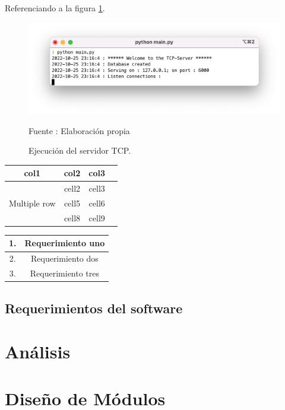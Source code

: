 Referenciando a la figura \ref{fig:servertcp_console}.
\begin{figure}[H]
    \begin{center}
        \includegraphics[width=15cm]{img/capitulo_4/tcp_server.png}
        \caption{Ejecución del servidor TCP.}
        Fuente : Elaboración propia
        \label{fig:servertcp_console}
    \end{center}
\end{figure}

\begin{center}
    \begin{tabular}{ |c|c|c|c| } 
    \hline
    \textbf{col1} & \textbf{col2} & \textbf{col3} \\
    \hline
    \multirow{3}{4em}{Multiple row} & cell2 & cell3 \\ 
    & cell5 & cell6  \\
    & cell8 & cell9 \\ 
    \hline
    \end{tabular}
\end{center}

\begin{center}
    \begin{tabular}{ |c|c| } 
     \hline
     1. & Requerimiento uno\\
     \hline 
     2. & Requerimiento dos \\ 
     \hline
     3. & Requerimiento tres \\ 
     \hline
    \end{tabular}
\end{center}

\subsection{Requerimientos del software}

\section{Análisis}
\section{Diseño de Módulos}

